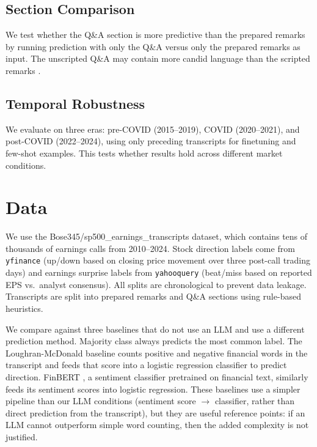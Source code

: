 \documentclass[11pt]{article}
\begin{document}
\subsection{Section Comparison}

We test whether the Q\&A section is more predictive than the prepared remarks by running prediction with only the Q\&A versus only the prepared remarks as input. The unscripted Q\&A may contain more candid language than the scripted remarks \citep{Qin2019}.

\subsection{Temporal Robustness}

We evaluate on three eras: pre-COVID (2015--2019), COVID (2020--2021), and post-COVID (2022--2024), using only preceding transcripts for finetuning and few-shot examples. This tests whether results hold across different market conditions.

\section{Data}

We use the Bose345/sp500\_earnings\_transcripts dataset, which contains tens of thousands of earnings calls from 2010--2024. Stock direction labels come from \texttt{yfinance} (up/down based on closing price movement over three post-call trading days) and earnings surprise labels from \texttt{yahooquery} (beat/miss based on reported EPS vs.\ analyst consensus). All splits are chronological to prevent data leakage. Transcripts are split into prepared remarks and Q\&A sections using rule-based heuristics.

We compare against three baselines that do not use an LLM and use a different prediction method. Majority class always predicts the most common label. The Loughran-McDonald baseline \citep{Loughran2011} counts positive and negative financial words in the transcript and feeds that score into a logistic regression classifier to predict direction. FinBERT \citep{Araci2019}, a sentiment classifier pretrained on financial text, similarly feeds its sentiment scores into logistic regression. These baselines use a simpler pipeline than our LLM conditions (sentiment score $\rightarrow$ classifier, rather than direct prediction from the transcript), but they are useful reference points: if an LLM cannot outperform simple word counting, then the added complexity is not justified.
\end{document}
